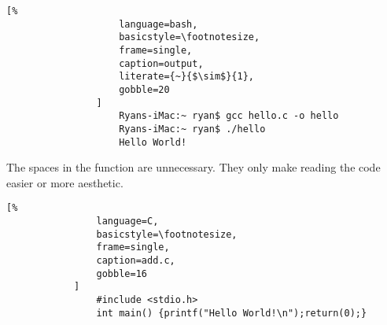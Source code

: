 \documentclass[crop=false,class=article,oneside]{standalone}
\begin{document}
            \begin{minipage}[t]{.48\textwidth}
                \centering
                \begin{lstlisting}[%
                    language=bash,
                    basicstyle=\footnotesize,
                    frame=single,
                    caption=output,
                    literate={~}{$\sim$}{1},
                    gobble=20
                ]
                    Ryans-iMac:~ ryan$ gcc hello.c -o hello
                    Ryans-iMac:~ ryan$ ./hello
                    Hello World!
                \end{lstlisting}
            \end{minipage}
            \newline
            The spaces in the function are unnecessary.
            They only make reading the code easier or more aesthetic.
            \begin{lstlisting}[%
                language=C,
                basicstyle=\footnotesize,
                frame=single,
                caption=add.c,
                gobble=16
            ]
                #include <stdio.h>
                int main() {printf("Hello World!\n");return(0);}
            \end{lstlisting}
\end{document}
